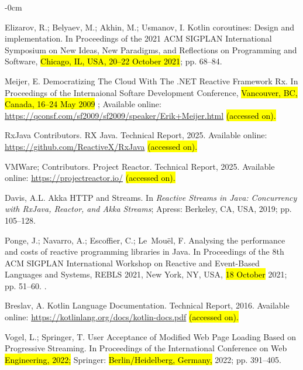 \documentclass[software,article,accept,pdftex,moreauthors]{Definitions/mdpi}
\begin{document}
\begin{adjustwidth}{-\extralength}{0cm}
\begin{thebibliography}{999}
Elizarov, R.; Belyaev, M.; Akhin, M.; Usmanov, I.
\newblock Kotlin coroutines: Design and implementation.
\newblock In Proceedings of the 2021 ACM SIGPLAN
  International Symposium on New Ideas, New Paradigms, and Reflections on
  Programming and Software, \hl{Chicago, IL, USA, 20--22 October 2021}; pp. 68--84.

Meijer, E.
\newblock Democratizing The Cloud With The .NET Reactive Framework Rx.
\newblock In Proceedings of the Internaional Softare Development Conference, \hl{Vancouver, BC, Canada, 16--24 May 2009} %
;  Available online: \url{https://qconsf.com/sf2009/sf2009/speaker/Erik+Meijer.html} \hl{(accessed on).} %


RxJava Contributors.
\newblock RX Java.
\newblock Technical Report, 2025. Available online: \url{https://github.com/ReactiveX/RxJava} \hl{(accessed on).}

VMWare; Contributors.
\newblock Project Reactor.
\newblock Technical Report, 2025. Available online: \url{https://projectreactor.io/} \hl{(accessed on).}

Davis, A.L. Akka HTTP and Streams.
\newblock In {\em Reactive Streams in Java: Concurrency with RxJava, Reactor,
  and Akka Streams}; Apress: Berkeley, CA, USA, 2019; pp. 105--128.

Ponge, J.; Navarro, A.; Escoffier, C.; Le~Mou\"{e}l, F.
\newblock Analysing the performance and costs of reactive programming libraries
  in Java.
\newblock In Proceedings of the 8th ACM SIGPLAN
  International Workshop on Reactive and Event-Based Languages and Systems, REBLS 2021, New
  York, NY, USA, \hl{18 October} 2021; pp. 51–60.
.

Breslav, A.
\newblock Kotlin Language Documentation.
\newblock Technical Report, 2016. Available online: \url{https://kotlinlang.org/docs/kotlin-docs.pdf} \hl{(accessed on).}

Vogel, L.; Springer, T.
\newblock User Acceptance of Modified Web Page Loading Based on Progressive
  Streaming.
\newblock In Proceedings of the International Conference on Web \hl{Engineering, 2022;} %
  Springer:  \hl{Berlin/Heidelberg, Germany,} %
 2022; pp. 391--405.


\end{thebibliography}
\end{adjustwidth}
\end{document}
